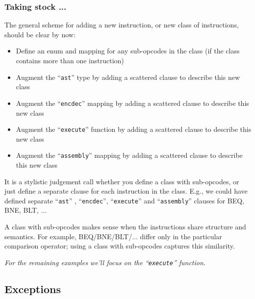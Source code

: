 \documentclass[aspectratio=169]{beamer}
\newcommand{\slidefont}{\scriptsize}
\newcommand{\cf}{\scriptsize\tt}
\begin{document}
\begin{frame}[fragile]
  \frametitle{Taking stock ...}

  \slidefont

  The general scheme for adding a new instruction, or new class of instructions, should be clear by now:
  \begin{itemize}
    \item Define an enum and mapping for any sub-opcodes in the class
      (if the class contains more than one instruction)
    \item Augment the ``{\cf ast}'' type by adding a scattered clause to describe this new class
    \item Augment the ``{\cf encdec}'' mapping by adding a scattered clause to describe this new class
    \item Augment the ``{\cf execute}'' function by adding a scattered clause to describe this new class
    \item Augment the ``{\cf assembly}'' mapping by adding a scattered clause to describe this new class
  \end{itemize}

  \vspace{1ex}

  It is a stylistic judgement call whether you define a class with
  sub-opcodes, or just define a separate clause for each instruction
  in the class.  E.g., we could have defined separate ``{\cf ast}'' ,
  ``{\cf encdec}'', ``{\cf execute}'' and ``{\cf assembly}'' clauses
  for BEQ, BNE, BLT, ...

  \vspace{1ex}

  A class with sub-opcodes makes sense when the instructions share
  structure and semantics.  For example, BEQ/BNE/BLT/... differ only
  in the particular comparison operator; using a class with
  sub-opcodes captures this similarity.

  \vspace{1ex}

  \centering
  \emph{For the remaining examples we'll focus on the ``{\cf execute}'' function.}

\end{frame}


\subsection{Exceptions}
\end{document}
